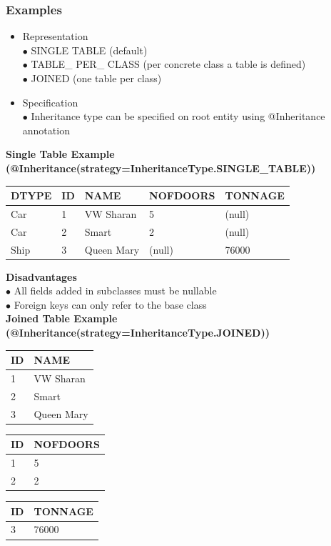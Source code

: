 \documentclass[10pt]{scrartcl}
\newcommand{\Bold}[1]{\textbf{#1}} %
\begin{document}
\subsubsection{Examples}

\begin{itemize}
\item Representation\\
$\bullet$ SINGLE TABLE (default)\\
$\bullet$ TABLE\_ PER\_ CLASS (per concrete class a table is defined)\\
$\bullet$ JOINED (one table per class)
\item Specification\\
$\bullet$ Inheritance type can be specified on root entity using @Inheritance annotation
\end{itemize}
\Bold{Single Table Example (@Inheritance(strategy=InheritanceType.SINGLE\_TABLE))}\\
\begin{tabular}{|l|l|l|l|l|}
\hline
DTYPE&ID&NAME&NOFDOORS&TONNAGE\\\hline
Car&1&VW Sharan&5&(null)\\\hline
Car&2&Smart&2&(null)\\\hline
Ship&3&Queen Mary&(null)&76000\\\hline
\end{tabular}
\Bold{Disadvantages}\\
$\bullet$ All fields added in subclasses must be nullable\\
$\bullet$ Foreign keys can only refer to the base class\\
\Bold{Joined Table Example (@Inheritance(strategy=InheritanceType.JOINED))}\\
\begin{tabular}{|l|l|}
\hline
ID&NAME\\\hline
1&VW Sharan\\\hline
2&Smart\\\hline
3&Queen Mary\\\hline
\end{tabular}
\hspace*{1cm}
\begin{tabular}{|l|l|}
\hline
ID&NOFDOORS\\\hline
1&5\\\hline
2&2\\\hline
\end{tabular}
\hspace*{1cm}
\begin{tabular}{|l|l|}
\hline
ID&TONNAGE\\\hline
3&76000\\\hline
\end{tabular}
\end{document}

